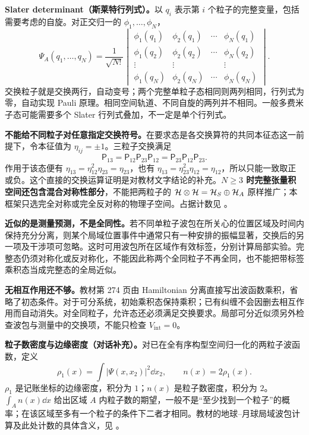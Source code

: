 \textbf{Slater determinant（斯莱特行列式）。}以 $q_i$ 表示第 $i$ 个粒子的完整变量，包括需要考虑的自旋。对正交归一的 $\phi_1,\ldots,\phi_N$，
\begin{equation}
  \boxed{\Psi_A(q_1,\ldots,q_N)=\frac1{\sqrt{N!}}
   \begin{vmatrix}
     \phi_1(q_1)&\phi_2(q_1)&\cdots&\phi_N(q_1)\\
     \phi_1(q_2)&\phi_2(q_2)&\cdots&\phi_N(q_2)\\
     \vdots&\vdots&&\vdots\\
     \phi_1(q_N)&\phi_2(q_N)&\cdots&\phi_N(q_N)
   \end{vmatrix}}.
\end{equation}
交换粒子就是交换两行，自动变号；两个完整单粒子态相同则两列相同，行列式为零，自动实现 Pauli 原理。相同空间轨道、不同自旋的两列并不相同。一般多费米子态可能需要多个 Slater 行列式叠加，不一定是单个行列式。

\textbf{不能给不同粒子对任意指定交换符号。}在要求态是各交换算符的共同本征态这一前提下，令本征值为 $\eta_{ij}=\pm1$。三粒子交换满足
\begin{equation}
  \mathsf P_{13}=\mathsf P_{12}\mathsf P_{23}\mathsf P_{12}
    =\mathsf P_{23}\mathsf P_{12}\mathsf P_{23}.
\end{equation}
作用于该态便有 $\eta_{13}=\eta_{12}^2\eta_{23}=\eta_{23}$，也有 $\eta_{13}=\eta_{23}^2\eta_{12}=\eta_{12}$，所以只能一致取正或负。这个直接的交换运算证明是对教材文字结论的补充。\textbf{$N\ge3$ 时完整张量积空间还包含混合对称性部分}，不能把两粒子的 $\mathcal{H}\otimes\mathcal{H}=\mathcal{H}_S\oplus\mathcal{H}_A$ 原样推广；本框架只选完全对称或完全反对称的物理子空间。占据计数见 。

\textbf{近似的是测量预测，不是全同性。}若不同单粒子波包在所关心的位置区域及时间内保持充分分离，则某个局域位置事件中通常只有一种安排的振幅显著，交换后的另一项及干涉项可忽略。这时可用波包所在区域作有效标签，分别计算局部实验。完整态仍须对称化或反对称化，不能因此称两个全同粒子不再全同，也不能把带标签乘积态当成完整态的全局近似。

\textbf{无相互作用还不够。}教材第 274 页由 Hamiltonian 分离直接写出波函数乘积，省略了初态条件。对于可分系统，初始乘积态保持乘积；已有纠缠不会因删去相互作用而自动消失。对全同粒子，允许态还必须满足交换要求。局部可分近似须另外检查波包与测量中的交换项，不能只检查 $V_{\mathrm{int}}=0$。

\textbf{粒子数密度与边缘密度（对话补充）。}对已在全有序构型空间归一化的两粒子波函数，定义
\begin{equation}
  \rho_1(x)=\int|\Psi(x,x_2)|^2\dd x_2,\qquad
  n(x)=2\rho_1(x).
\end{equation}
$\rho_1$ 是记账坐标的边缘密度，积分为 $1$；$n(x)$ 是粒子数密度，积分为 $2$。$\int_A n(x)\dd x$ 给出区域 $A$ 内粒子数的期望，一般不是“至少找到一个粒子”的概率；在该区域至多有一个粒子的条件下二者才相同。教材的地球--月球局域波包计算及此处计数的具体含义，见 。

